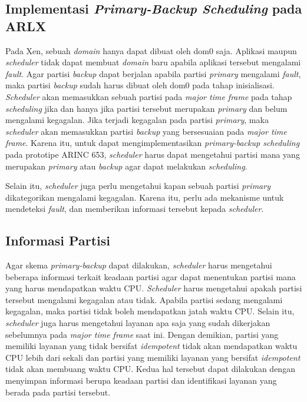\subsection{Implementasi \textit{Primary-Backup Scheduling} pada ARLX}

Pada Xen, sebuah \textit{domain} hanya dapat dibuat oleh dom0 saja.  Aplikasi maupun
\textit{scheduler} tidak dapat membuat \textit{domain} baru apabila aplikasi tersebut mengalami
\textit{fault}.  Agar partisi \textit{backup} dapat berjalan apabila partisi \textit{primary}
mengalami \textit{fault}, maka partisi \textit{backup} sudah harus dibuat oleh dom0 pada tahap
inisialisasi.  \textit{Scheduler} akan memasukkan sebuah partisi pada \textit{major time frame}
pada tahap \textit{scheduling} jika dan hanya jika partisi tersebut merupakan \textit{primary}
dan belum mengalami kegagalan.  Jika terjadi kegagalan pada partisi \textit{primary}, maka
\textit{scheduler} akan memasukkan partisi \textit{backup} yang bersesuaian pada \textit{major
time frame}.  Karena itu, untuk dapat mengimplementasikan \textit{primary-backup scheduling}
pada prototipe ARINC 653, \textit{scheduler} harus dapat mengetahui partisi mana yang merupakan
\textit{primary} atau \textit{backup} agar dapat melakukan \textit{scheduling}.

Selain itu, \textit{scheduler} juga perlu mengetahui kapan sebuah partisi \textit{primary}
dikategorikan mengalami kegagalan. Karena itu, perlu ada mekanisme untuk mendeteksi
\textit{fault}, dan memberikan informasi tersebut kepada \textit{scheduler}.

\subsection{Informasi Partisi}
\label{section:informasi_partisi}

Agar skema \textit{primary-backup} dapat dilakukan, \textit{scheduler} harus mengetahui beberapa
informasi terkait keadaan partisi agar dapat menentukan partisi mana yang harus mendapatkan
waktu CPU. \textit{Scheduler} harus mengetahui apakah partisi tersebut mengalami
kegagalan atau tidak. Apabila partisi sedang mengalami kegagalan, maka partisi tidak
boleh mendapatkan jatah waktu CPU. Selain itu, \textit{scheduler} juga harus mengetahui
layanan apa saja yang sudah dikerjakan sebelumnya pada \textit{major time frame} saat
ini. Dengan demikian, partisi yang memiliki layanan yang tidak bersifat
\textit{idempotent} tidak akan mendapatkan waktu CPU lebih dari sekali dan partisi yang memiliki
layanan yang bersifat \textit{idempotent} tidak akan membuang waktu CPU. Kedua hal
tersebut dapat dilakukan dengan menyimpan informasi berupa keadaan partisi dan identifikasi
layanan yang berada pada partisi tersebut.

